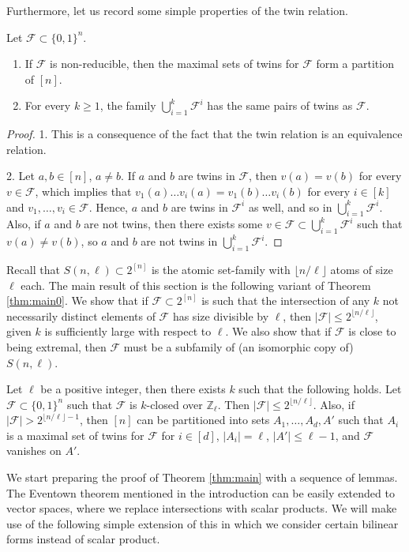 	\noindent
	Furthermore, let us record some simple properties of the twin relation. 
	\begin{claim}\label{claim:twins}
		Let $\mathcal{F}\subset \{0,1\}^{n}$.
		\begin{enumerate}
			\item If $\mathcal{F}$ is non-reducible, then the maximal sets of twins for $\mathcal{F}$ form a partition of $[n]$.
			
			\item For every $k\geq 1$, the family $\bigcup_{i=1}^{k} \mathcal{F}^{i}$ has the same pairs of twins as $\mathcal{F}$.
			
		\end{enumerate}
	\end{claim}
	\begin{proof}
		1. This is a consequence of the fact that the twin relation is an equivalence relation.
		
		2. Let $a,b\in [n]$, $a\neq b$. If $a$ and $b$ are twins in $\mathcal{F}$, then $v(a)=v(b)$ for every $v\in\mathcal{F}$, which implies that $v_1(a)\dots v_i(a)=v_1(b)\dots v_i(b)$ for every $i\in [k]$ and $v_1,\dots,v_i\in\mathcal{F}$. Hence, $a$ and $b$ are twins in $\mathcal{F}^{i}$ as well, and so in $\bigcup_{i=1}^{k}\mathcal{F}^i$. Also, if $a$ and $b$ are not twins, then there exists some $v\in\mathcal{F}\subset \bigcup_{i=1}^{k}\mathcal{F}^i$ such that $v(a)\neq v(b)$, so $a$ and $b$ are not twins in $\bigcup_{i=1}^{k}\mathcal{F}^i$.
	\end{proof}
	Recall that $S(n,\ell) \subset 2^{[n]}$ is the atomic set-family with $\lfloor n/\ell \rfloor$ atoms of size $\ell$ each. 
	The main result of this section is the following variant of Theorem \ref{thm:main0}. We show that if $\mathcal{F}\subset 2^{[n]}$ is such that the intersection of any $k$ not necessarily distinct elements of $\mathcal{F}$ has size divisible by $\ell$, then $|\mathcal{F}|\leq 2^{\lfloor n/\ell\rfloor}$, given $k$ is sufficiently large with respect to $\ell$. We also show that if $\mathcal{F}$ is close to being extremal, then $\mathcal{F}$ must be a subfamily of (an isomorphic copy of) $S(n,\ell)$. 
	\begin{theorem}\label{thm:main}
		Let $\ell$ be a positive integer, then there exists $k$ such that the following holds. Let $\mathcal{F}\subset \{0,1\}^{n}$ such that $\mathcal{F}$ is $k$-closed over $\mathbb{Z}_{\ell}$. Then $|\mathcal{F}|\leq 2^{\lfloor n/\ell\rfloor}$. Also, if $|\mathcal{F}|> 2^{\lfloor n/\ell\rfloor-1}$, then $[n]$ can be partitioned into sets $A_{1},\dots,A_{d},A'$ such that $A_{i}$ is a maximal set of twins for $\mathcal{F}$ for $i\in [d]$, $|A_{i}|=\ell$, $|A'|\leq \ell-1$, and $\mathcal{F}$ vanishes on $A'$. 
	\end{theorem}
	We start preparing the proof of Theorem \ref{thm:main} with a sequence of lemmas. 
	The Eventown theorem mentioned in the introduction can be easily extended to vector spaces, where we replace intersections with scalar products. We will make use of the following simple extension of this in which we consider certain bilinear forms instead of scalar product.
	
